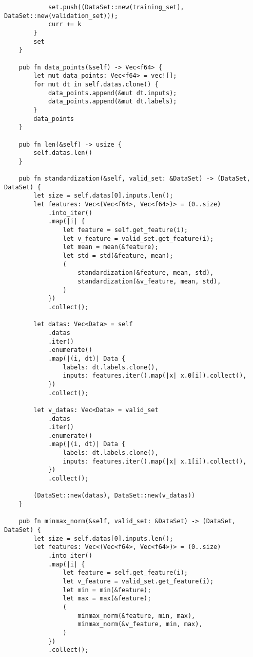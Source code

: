 \begin{code}
\begin{verbatim}
            set.push((DataSet::new(training_set), DataSet::new(validation_set)));
            curr += k
        }
        set
    }

    pub fn data_points(&self) -> Vec<f64> {
        let mut data_points: Vec<f64> = vec![];
        for mut dt in self.datas.clone() {
            data_points.append(&mut dt.inputs);
            data_points.append(&mut dt.labels);
        }
        data_points
    }

    pub fn len(&self) -> usize {
        self.datas.len()
    }

    pub fn standardization(&self, valid_set: &DataSet) -> (DataSet, DataSet) {
        let size = self.datas[0].inputs.len();
        let features: Vec<(Vec<f64>, Vec<f64>)> = (0..size)
            .into_iter()
            .map(|i| {
                let feature = self.get_feature(i);
                let v_feature = valid_set.get_feature(i);
                let mean = mean(&feature);
                let std = std(&feature, mean);
                (
                    standardization(&feature, mean, std),
                    standardization(&v_feature, mean, std),
                )
            })
            .collect();

        let datas: Vec<Data> = self
            .datas
            .iter()
            .enumerate()
            .map(|(i, dt)| Data {
                labels: dt.labels.clone(),
                inputs: features.iter().map(|x| x.0[i]).collect(),
            })
            .collect();

        let v_datas: Vec<Data> = valid_set
            .datas
            .iter()
            .enumerate()
            .map(|(i, dt)| Data {
                labels: dt.labels.clone(),
                inputs: features.iter().map(|x| x.1[i]).collect(),
            })
            .collect();

        (DataSet::new(datas), DataSet::new(v_datas))
    }

    pub fn minmax_norm(&self, valid_set: &DataSet) -> (DataSet, DataSet) {
        let size = self.datas[0].inputs.len();
        let features: Vec<(Vec<f64>, Vec<f64>)> = (0..size)
            .into_iter()
            .map(|i| {
                let feature = self.get_feature(i);
                let v_feature = valid_set.get_feature(i);
                let min = min(&feature);
                let max = max(&feature);
                (
                    minmax_norm(&feature, min, max),
                    minmax_norm(&v_feature, min, max),
                )
            })
            .collect();


\end{verbatim}
\end{code}
